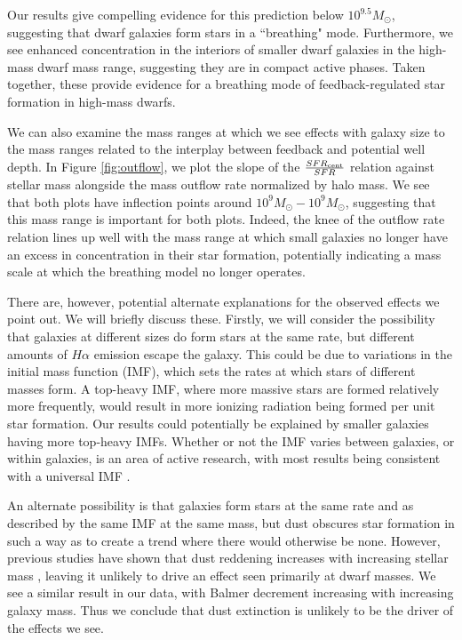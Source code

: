 \documentclass[iop]{emulateapj}
\begin{document}
Our results give compelling evidence for this prediction below $10^{9.5} M_{\odot}$, suggesting that dwarf galaxies form stars in a ``breathing" mode. Furthermore, we see enhanced concentration in the interiors of smaller dwarf galaxies in the high-mass dwarf mass range, suggesting they are in compact active phases. Taken together, these provide evidence for a breathing mode of feedback-regulated star formation in high-mass dwarfs.

We can also examine the mass ranges at which we see effects with galaxy size to the mass ranges related to the interplay between feedback and potential well depth. In Figure \ref{fig:outflow}, we plot the slope of the $\frac{SFR_{\rm cent}}{SFR}$ relation against stellar mass alongside the mass outflow rate normalized by halo mass. We see that both plots have inflection points around $10^{9} M_{\odot}-10^{9} M_{\odot}$, suggesting that this mass range is important for both plots. Indeed, the knee of the outflow rate relation lines up well with the mass range at which small galaxies no longer have an excess in concentration in their star formation, potentially indicating a mass scale at which the breathing model no longer operates.

There are, however, potential alternate explanations for the observed effects we point out. We will briefly discuss these. Firstly, we will consider the possibility that galaxies at different sizes do form stars at the same rate, but different amounts of $H\alpha$ emission escape the galaxy. This could be due to variations in the initial mass function (IMF), which sets the rates at which stars of different masses form. A top-heavy IMF, where more massive stars are formed relatively more frequently, would result in more ionizing radiation being formed per unit star formation. Our results could potentially be explained by smaller galaxies having more top-heavy IMFs. Whether or not the IMF varies between galaxies, or within galaxies, is an area of active research, with most results being consistent with a universal IMF \citep[e.g.,][]{Lee09,Bastian10}. 

An alternate possibility is that galaxies form stars at the same rate and as described by the same IMF at the same mass, but dust obscures star formation in such a way as to create a trend where there would otherwise be none. However, previous studies have shown that dust reddening increases with increasing stellar mass \citep{Garn10}, leaving it unlikely to drive an effect seen primarily at dwarf masses. We see a similar result in our data, with Balmer decrement increasing with increasing galaxy mass. Thus we conclude that dust extinction is unlikely to be the driver of the effects we see.
\end{document}
